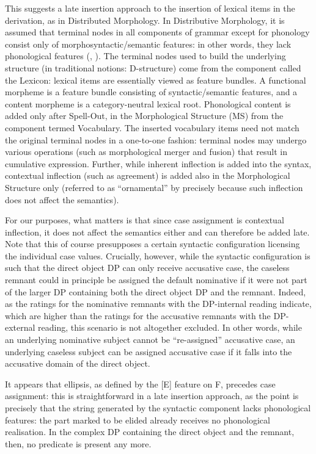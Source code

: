 This suggests a late insertion approach to the insertion of lexical items in the derivation, as in Distributed Morphology. In Distributive Morphology, it is assumed that terminal nodes in all components of grammar except for phonology consist only of morphosyntactic/semantic features: in other words, they lack phonological features (\citealt{hallemarantz1993}, \citealt{embicknoyer2007}). The terminal nodes used to build the underlying structure (in traditional notions: D-structure) come from the component called the Lexicon: lexical items are essentially viewed as feature bundles. A functional morpheme is a feature bundle consisting of syntactic/semantic features, and a content morpheme is a category-neutral lexical root. Phonological content is added only after Spell-Out, in the Morphological Structure (MS) from the component termed Vocabulary. The inserted vocabulary items need not match the original terminal nodes in a one-to-one fashion: terminal nodes may undergo various operations (such as morphological merger and fusion) that result in cumulative expression. Further, while inherent inflection is added into the syntax, contextual inflection (such as agreement) is added also in the Morphological Structure only (referred to as ``ornamental'' by \citealt{embicknoyer2007} precisely because such inflection does not affect the semantics). 

For our purposes, what matters is that since case assignment is contextual inflection, it does not affect the semantics either and can therefore be added late. Note that this of course presupposes a certain syntactic configuration licensing the individual case values. Crucially, however, while the syntactic configuration is such that the direct object DP can only receive accusative case, the caseless remnant could in principle be assigned the default nominative if it were not part of the larger DP containing both the direct object DP and the remnant. Indeed, as the ratings for the nominative remnants with the DP-internal reading indicate, which are higher than the ratings for the accusative remnants with the DP-external reading, this scenario is not altogether excluded. In other words, while an underlying nominative subject cannot be ``re-assigned'' accusative case, an underlying caseless subject can be assigned accusative case if it falls into the accusative domain of the direct object.

It appears that ellipsis, as defined by the [E] feature on F, precedes case assignment: this is straightforward in a late insertion approach, as the point is precisely that the string generated by the syntactic component lacks phonological features: the part marked to be elided already receives no phonological realisation. In the complex DP containing the direct object and the remnant, then, no predicate is present any more.

